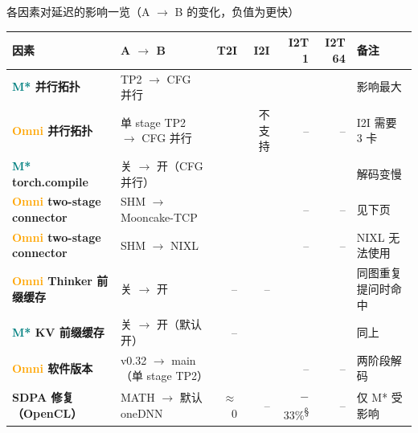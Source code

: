 
\begin{frame}[t]{各因素对延迟的影响一览（A $\rightarrow$ B 的变化，负值为更快）}
\scriptsize\def\codesize{\relax}
\renewcommand{\arraystretch}{1.12}\setlength{\tabcolsep}{3pt}
\begin{tabularx}{\textwidth}{>{\bfseries}p{3.1cm} p{3.6cm} r r r r Y}
\toprule
{}
因素 & A $\rightarrow$ B & T2I & I2I & I2T 1 & I2T 64 & 备注 \\
\midrule
\textcolor{Teal}{M*} 并行拓扑 & TP2 $\rightarrow$ CFG 并行 &  &  &  &  & 影响最大 \\
\textcolor{Orange}{Omni} 并行拓扑 & 单 stage TP2 $\rightarrow$ CFG 并行 &  & 不支持 & -- & -- & I2I 需要 3 卡 \\
\textcolor{Teal}{M*} torch.compile & 关 $\rightarrow$ 开（CFG 并行） &  &  &  &  & 解码变慢 \\
\textcolor{Orange}{Omni} two-stage connector & SHM $\rightarrow$ Mooncake-TCP &  &  & -- & -- & 见下页 \\
\textcolor{Orange}{Omni} two-stage connector & SHM $\rightarrow$ NIXL &  &  & -- & -- & NIXL 无法使用 \\
\textcolor{Orange}{Omni} Thinker 前缀缓存 & 关 $\rightarrow$ 开 & -- & -- &  &  & 同图重复提问时命中 \\
\textcolor{Teal}{M*} KV 前缀缓存 & 关 $\rightarrow$ 开（默认开） & -- &  &  &  & 同上 \\
\textcolor{Orange}{Omni} 软件版本 & v0.32 $\rightarrow$ main（单 stage TP2） &  &  & -- & -- & 两阶段解码  \\
SDPA 修复（OpenCL） & MATH $\rightarrow$ 默认 oneDNN & $\approx$0 & -- & $-$33\%\textsuperscript{§} & -- & 仅 M* 受影响 \\
\bottomrule
\end{tabularx}
\vspace{2pt}
\end{frame}

